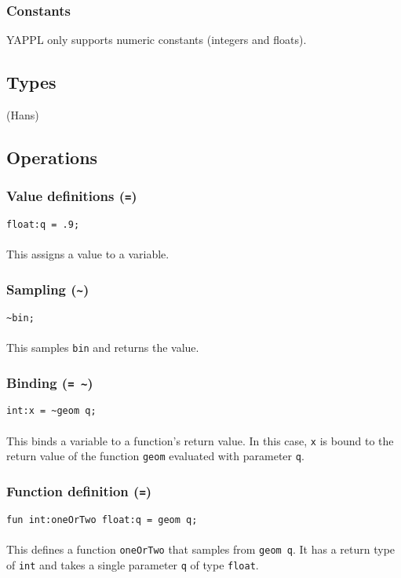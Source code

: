 \subsubsection{Constants}

YAPPL only supports numeric constants (integers and floats).

\subsection{Types}

(Hans)

\subsection{Operations}

\subsubsection{Value definitions (\texttt{=})}
\texttt{float:q = .9;}\\
\\
This assigns a value to a variable. 

\subsubsection{Sampling (\texttt{\textasciitilde})}
\texttt{\textasciitilde bin;}\\
\\
This samples \texttt{bin} and returns the value.

\subsubsection{Binding (\texttt{= \textasciitilde })}
\texttt{int:x = \textasciitilde geom q;}\\
\\
This binds a variable to a function's return value. In this case, \texttt{x} is bound to the return value of the function \texttt{geom} evaluated with parameter \texttt{q}.

\subsubsection{Function definition (\texttt{=})}
\texttt{fun int:oneOrTwo float:q = geom q;}\\
\\
This defines a function \texttt{oneOrTwo} that samples from \texttt{geom q}. It has a return type of \texttt{int} and takes a single parameter \texttt{q} of type \texttt{float}. 

